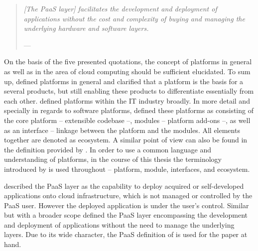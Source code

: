 \begin{quotation}{\slshape
[The \ac{PaaS} layer] facilitates the development and deployment of applications without the cost and complexity of buying and managing the underlying hardware and software layers.}
\vspace*{-7pt}
\begin{flushright}
	--- \citealp[p. 178]{Marston2011}
\end{flushright}
\end{quotation}

On the basis of the five presented quotations, the concept of platforms in general as well as in the area of cloud computing should be sufficient elucidated. To sum up, \citet[pp. 150-151]{Halman2003} defined platforms in general and clarified that a platform is the basis for a several products, but still enabling these products to differentiate essentially from each other. \citet[p. 88]{Poel2007} defined platforms within the \ac{IT} industry broadly. In more detail and specially in regards to software platforms, \citet[p. 676]{Tiwana2010} defined these platforms as consisting of the core platform -- extensible codebase --, modules -- platform add-ons --, as well as an interface -- linkage between the platform and the modules. All elements together are denoted as ecosystem. A similar point of view can also be found in the definition provided by \citet[pp. 150-151]{Halman2003}. In order to use a common language and understanding of platforms, in the course of this thesis the terminology introduced by \citet{Tiwana2010} is used throughout -- platform, module, interfaces, and ecosystem.  	

\citet[pp. 2-3]{Mell2011} described the \ac{PaaS} layer as the capability to deploy acquired or self-developed applications onto cloud infrastructure, which is not managed or controlled by the \ac{PaaS} user. However the deployed application is under the user's control. Similar but with a broader scope \citet[p. 178]{Marston2011} defined the \ac{PaaS} layer encompassing the development and deployment of applications without the need to manage the underlying layers. Due to its wide character, the \ac{PaaS} definition of \citet[p. 178]{Marston2011} is used for the paper at hand. 

